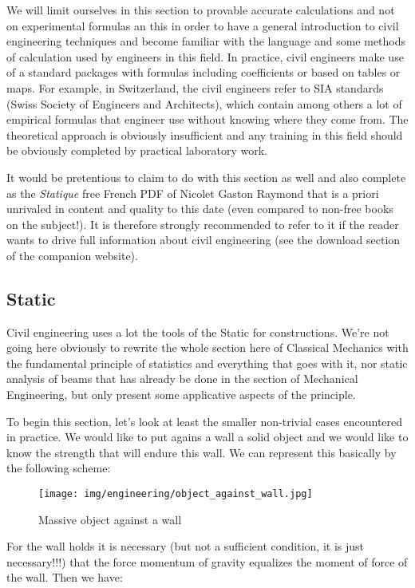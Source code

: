 	We will limit ourselves in this section to provable accurate calculations and not on experimental formulas an this in order to have a general introduction to civil engineering techniques and become familiar with the language and some methods of calculation used by engineers in this field. In practice, civil engineers make use of a standard packages with formulas including coefficients or based on tables or maps. For example, in Switzerland, the civil engineers refer to SIA standards (Swiss Society of Engineers and Architects), which contain among others a lot of empirical formulas that engineer use without knowing where they come from. The theoretical approach is obviously insufficient and any training in this field should be obviously completed by practical laboratory work.
	\begin{tcolorbox}[title=Remark,colframe=black,arc=10pt]
	It would be pretentious to claim to do with this section as well and also complete as the \textit{Statique} free French PDF of Nicolet Gaston Raymond that is a priori unrivaled in content and quality to this date (even compared to non-free books on the subject!). It is therefore strongly recommended to refer to it if the reader wants to drive full information about civil engineering (see the download section of the companion website).
	\end{tcolorbox}
	
	\pagebreak
	\subsection{Static}
	Civil engineering uses a lot the tools of the Static for constructions. We're not going here obviously to rewrite the whole section here of Classical Mechanics with the fundamental principle of statistics and everything that goes with it, nor static analysis of beams that has already be done in the section of Mechanical Engineering, but only present some applicative aspects of the principle.
	
	To begin this section, let's look at least the smaller non-trivial cases encountered in practice. We would like to put agains a wall a solid object and we would like to know the strength that will endure this wall. We can represent this basically by the following scheme:
	\begin{figure}[H]
		\centering
		\texttt{[image: img/engineering/object\_against\_wall.jpg]}
		\caption{Massive object against a wall}
	\end{figure}
	For the wall holds it is necessary (but not  a sufficient condition, it is just necessary!!!) that the force momentum of gravity equalizes the moment of force of the wall. Then we have:
	
